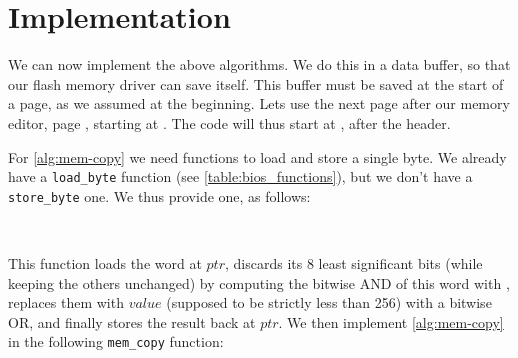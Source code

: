 \section{Implementation}\label{section:flash-memory-driver-impl}


We can now implement the above algorithms. We do this in a data buffer, so that
our flash memory driver can save itself. This buffer must be saved at the start
of a page, as we assumed at the beginning. Lets use the next page after our
memory editor, page , starting at
. The code will thus start at
, after the header.

For \cref{alg:mem-copy} we need functions to load and store a single byte. We
already have a \verb!load_byte! function (see \cref{table:bios_functions}), but
we don't have a \verb!store_byte! one. We thus provide one, as follows:


\begin{TwoColumns}
\\
\end{TwoColumns}

This function loads the word at $ptr$, discards its 8 least significant bits
(while keeping the others unchanged) by computing the bitwise AND of this word
with , replaces them with $value$ (supposed to be strictly less
than 256) with a bitwise OR, and finally stores the result back at $ptr$. We
then implement \cref{alg:mem-copy} in the following \verb!mem_copy!
function:

